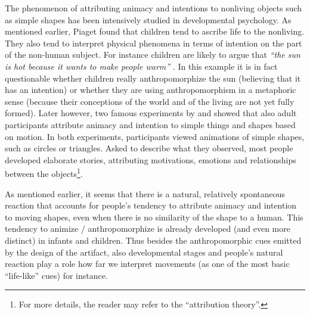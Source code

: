 \documentclass{frontiersSCNS} %
\begin{document}
The phenomenon of attributing animacy and intentions to nonliving objects such
as simple shapes has been intensively studied in developmental psychology. As
mentioned earlier, Piaget found that children tend to ascribe life to the
nonliving. They also tend to interpret physical phenomena in terms of intention
on the part of the non-human subject. For instance children are likely to argue
that \textit{``the sun is hot because it wants to make people warm''}
\citep{leeds_childrens_1992}. In this example it is in fact questionable whether
children really anthropomorphize the sun (believing that it has an intention) or
whether they are using anthropomorphism in a metaphoric sense (because their
conceptions of the world and of the living are not yet fully formed). Later
however, two famous experiments by \cite{heider_experimental_1944} and
\cite{michotte_perception_1963} showed that also adult participants attribute
animacy and intention to simple things and shapes based on motion. In both
experiments, participants viewed animations of simple shapes, such as circles or
triangles. Asked to describe what they observed, most people developed
elaborate stories, attributing motivations, emotions and relationships between
the objects\footnote{For more details, the reader may refer to the ``attribution
theory''.}.


As mentioned earlier, it seems that there is a natural, relatively spontaneous
reaction that accounts for people's tendency to attribute animacy and intention
to moving shapes, even when there is no similarity of the shape to a human. This
tendency to animize / anthropomorphize is already developed (and even more
distinct) in infants and children. Thus besides the anthropomorphic cues emitted
by the design of the artifact, also developmental stages and people's natural
reaction play a role how far we interpret movements (as one of the
most basic ``life-like'' cues) for instance.
\end{document}
